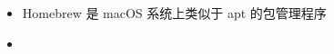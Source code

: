 
\begin{issues}
\issueDraft
\end{issues}

\begin{itemize}
\item Homebrew 是 macOS 系统上类似于 apt 的包管理程序
\item 
\end{itemize}
